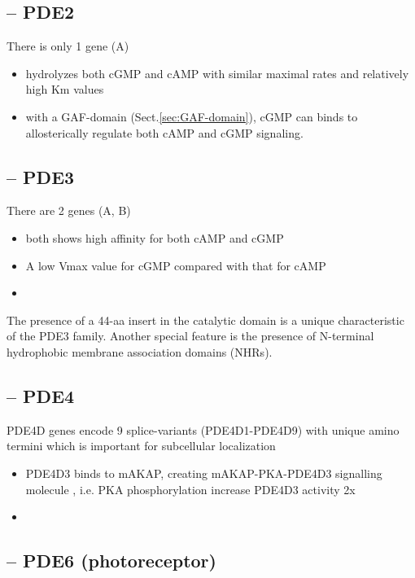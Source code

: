\subsection{-- PDE2}

There is only 1 gene (A)
\begin{itemize}
  \item hydrolyzes both cGMP and cAMP with similar maximal rates and relatively
  high Km values

  \item with a GAF-domain (Sect.\ref{sec:GAF-domain}), cGMP can binds to
  allosterically regulate both cAMP and cGMP signaling. 
\end{itemize}


\subsection{-- PDE3}

There are 2 genes (A, B)
\begin{itemize}
  \item both shows high affinity for both cAMP and cGMP
  
  \item A low Vmax value for cGMP compared with that for cAMP
  
  \item 
\end{itemize}

The presence of a 44-aa insert in the catalytic domain is a
unique characteristic of the PDE3 family. Another special
feature is the presence of N-terminal hydrophobic membrane
association domains (NHRs). 


\subsection{-- PDE4}
\label{sec:PDE4}

PDE4D genes encode 9 splice-variants (PDE4D1-PDE4D9) with unique amino termini
which is important for subcellular localization

\begin{itemize}
  \item PDE4D3 binds to mAKAP, creating mAKAP-PKA-PDE4D3 signalling molecule
  \citep{Dodge2001}, i.e. PKA phosphorylation increase PDE4D3 activity 2x
  \citep{Lehnart2005}

  \item  
\end{itemize}

\subsection{-- PDE6 (photoreceptor)}
\label{sec:PDE6}

